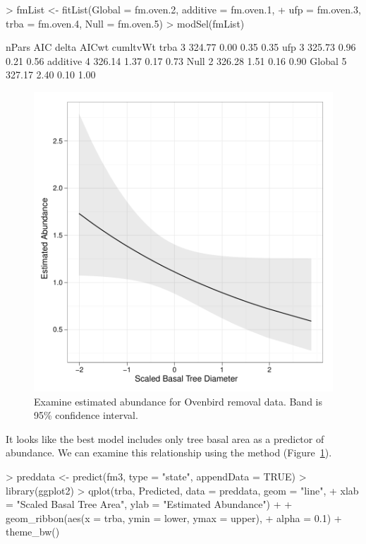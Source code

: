 \documentclass[article,shortnames]{jss}
\begin{document}
\begin{Schunk}
\begin{Sinput}
> fmList <- fitList(Global = fm.oven.2, additive = fm.oven.1, 
+     ufp = fm.oven.3, trba = fm.oven.4, Null = fm.oven.5)
> modSel(fmList)
\end{Sinput}
\begin{Soutput}
         nPars    AIC delta AICwt cumltvWt
trba         3 324.77  0.00  0.35     0.35
ufp          3 325.73  0.96  0.21     0.56
additive     4 326.14  1.37  0.17     0.73
Null         2 326.28  1.51  0.16     0.90
Global       5 327.17  2.40  0.10     1.00
\end{Soutput}
\end{Schunk}


\begin{figure}[ht]
  \centering
\includegraphics{unmarked-029}
\caption{Examine estimated abundance for Ovenbird removal data.  Band
  is 95\% confidence interval.}
\label{fig:pred}
\end{figure}


It looks like the best model includes only tree basal area as a
predictor of abundance.  We can examine this relationship using
the  method (Figure~\ref{fig:pred}).



\begin{Schunk}
\begin{Sinput}
> preddata <- predict(fm3, type = "state", appendData = TRUE)
> library(ggplot2)
> qplot(trba, Predicted, data = preddata, geom = "line", 
+     xlab = "Scaled Basal Tree Area", ylab = "Estimated Abundance") + 
+     geom_ribbon(aes(x = trba, ymin = lower, ymax = upper), 
+         alpha = 0.1) + theme_bw()
\end{Sinput}
\end{Schunk}
\end{document}
